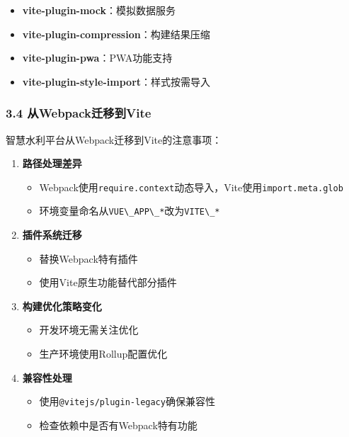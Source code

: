 \begin{itemize}
\tightlist
\item
  \textbf{vite-plugin-mock}：模拟数据服务
\item
  \textbf{vite-plugin-compression}：构建结果压缩
\item
  \textbf{vite-plugin-pwa}：PWA功能支持
\item
  \textbf{vite-plugin-style-import}：样式按需导入
\end{itemize}

\subsubsection{3.4
从Webpack迁移到Vite}\label{ux4ecewebpackux8fc1ux79fbux5230vite}

智慧水利平台从Webpack迁移到Vite的注意事项：

\begin{enumerate}
\def\labelenumi{\arabic{enumi}.}
\tightlist
\item
  \textbf{路径处理差异}

  \begin{itemize}
  \tightlist
  \item
    Webpack使用\passthrough{\lstinline!require.context!}动态导入，Vite使用\passthrough{\lstinline!import.meta.glob!}
  \item
    环境变量命名从\passthrough{\lstinline!VUE\_APP\_*!}改为\passthrough{\lstinline!VITE\_*!}
  \end{itemize}
\item
  \textbf{插件系统迁移}

  \begin{itemize}
  \tightlist
  \item
    替换Webpack特有插件
  \item
    使用Vite原生功能替代部分插件
  \end{itemize}
\item
  \textbf{构建优化策略变化}

  \begin{itemize}
  \tightlist
  \item
    开发环境无需关注优化
  \item
    生产环境使用Rollup配置优化
  \end{itemize}
\item
  \textbf{兼容性处理}

  \begin{itemize}
  \tightlist
  \item
    使用\passthrough{\lstinline!@vitejs/plugin-legacy!}确保兼容性
  \item
    检查依赖中是否有Webpack特有功能
  \end{itemize}
\end{enumerate}

